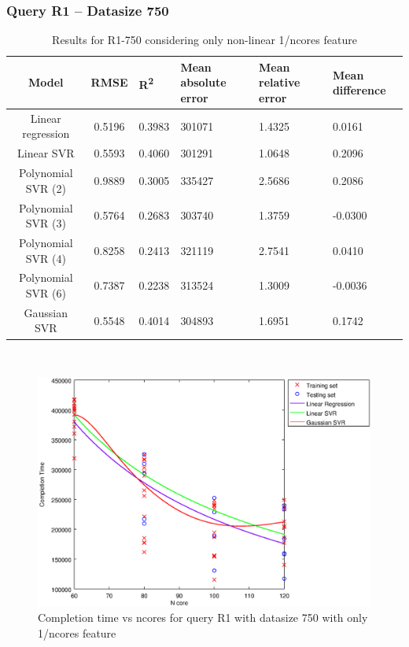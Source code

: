 \documentclass[a4paper,11pt]{article}
\begin{document}
\newpage
\subsubsection{Query R1 -- Datasize 750}
\begin{table}[H]
	\centering
	\begin{adjustbox}{center}
		\begin{tabular}{c | c M{1.2cm} M{2.5cm} M{2.5cm} M{1.8cm}}
			Model & RMSE & R\textsuperscript{2} & Mean absolute error & Mean relative error & Mean difference \tabularnewline
			\hline
			Linear regression & 0.5196 & 0.3983 & 301071 & 1.4325 & 0.0161 \\
			Linear SVR & 0.5593 & 0.4060 & 301291 & 1.0648 & 0.2096 \\
			Polynomial SVR (2) & 0.9889 & 0.3005 & 335427 & 2.5686 & 0.2086 \\
			Polynomial SVR (3) & 0.5764 & 0.2683 & 303740 & 1.3759 & -0.0300 \\
			Polynomial SVR (4) & 0.8258 & 0.2413 & 321119 & 2.7541 & 0.0410 \\
			Polynomial SVR (6) & 0.7387 & 0.2238 & 313524 & 1.3009 & -0.0036 \\
			Gaussian SVR & 0.5548 & 0.4014 & 304893 & 1.6951 & 0.1742 \\
		\end{tabular}
	\end{adjustbox}
	\\
	\caption{Results for R1-750 considering only non-linear 1/ncores feature}
	\label{table_R1_prediction_all}
\end{table}

\begin {figure}[hbtp]
\centering
\includegraphics[width=\textwidth]{output/R1_750_ONLY_1_OVER_NCORES/plot_R1_750_bestmodels.eps}
\caption {Completion time vs ncores for query R1 with datasize 750 with only 1/ncores feature}
\end {figure}
\end{document}
